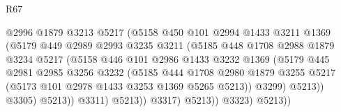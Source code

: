 \begin{lexlean}{R67}
\begin{coremodule}
                                    @2996
                                    @1879
                                    @3213
                                    @5217
                                    (@5158
                                      @450
                                      @101
                                      @2994
                                      @1433
                                      @3211
                                      @1369
                                      (@5179
                                        @449
                                        @2989
                                        @2993
                                        @3235
                                        @3211
                                        (@5185
                                          @448
                                          @1708
                                          @2988
                                          @1879
                                          @3234
                                          @5217
                                          (@5158
                                            @446
                                            @101
                                            @2986
                                            @1433
                                            @3232
                                            @1369
                                            (@5179
                                              @445
                                              @2981
                                              @2985
                                              @3256
                                              @3232
                                              (@5185
                                                @444
                                                @1708
                                                @2980
                                                @1879
                                                @3255
                                                @5217
                                                (@5173 @101 @2978 @1433 @3253 @1369 @5265 @5213))
                                              @3299)
                                            @5213))
                                        @3305)
                                      @5213))
                                  @3311)
                                @5213))
                            @3317)
                          @5213))
                      @3323)
                    @5213))

\end{coremodule}
\end{lexlean}
